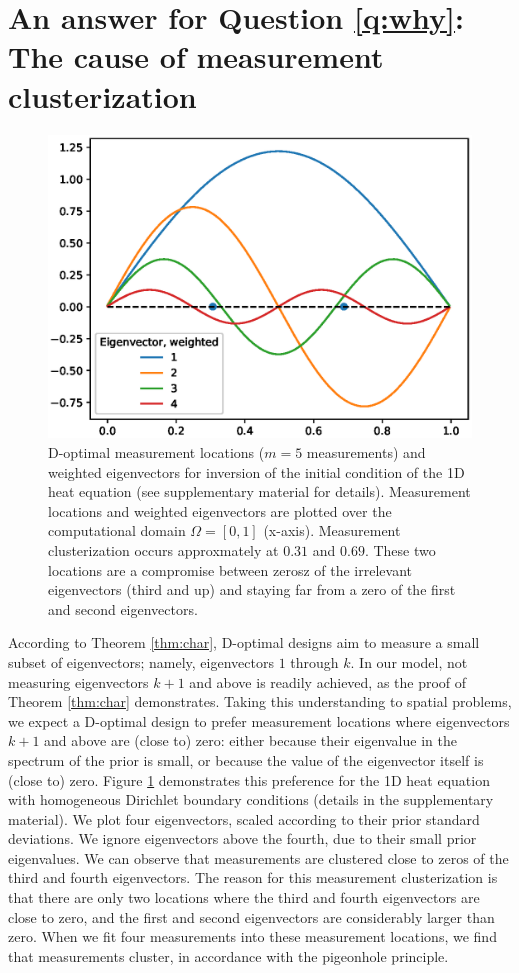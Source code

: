 \section{An answer for Question \ref{q:why}: The cause of measurement clusterization}\label{section:why}
\begin{figure}[H]
    \centering
    \includegraphics[height=0.5\textwidth]{eigenvectors.eps}
    \caption{D-optimal measurement locations ($m=5$ measurements) and
      weighted eigenvectors for inversion of the initial condition of
      the 1D heat equation (see supplementary material for
      details). Measurement locations and weighted eigenvectors are
      plotted over the computational domain $\Omega = [0, 1]$
      (x-axis).  Measurement clusterization occurs approxmately at
      $0.31$ and $0.69$. These two locations are a compromise between
      zerosz of the irrelevant eigenvectors (third and up) and staying
      far from a zero of the first and second eigenvectors.}
  \label{fig:why}
\end{figure}


According to Theorem \ref{thm:char}, D-optimal designs aim to measure
a small subset of eigenvectors; namely, eigenvectors $1$ through
$k$. In our model, not measuring eigenvectors $k+1$ and above is
readily achieved, as the proof of Theorem \ref{thm:char} demonstrates.
Taking this understanding to spatial problems, we expect a D-optimal
design to prefer measurement locations where eigenvectors $k+1$ and
above are (close to) zero: either because their eigenvalue in the
spectrum of the prior is small, or because the value of the
eigenvector itself is (close to) zero. Figure \ref{fig:why}
demonstrates this preference for the 1D heat equation with homogeneous
Dirichlet boundary conditions (details in the supplementary
material). We plot four eigenvectors, scaled according to their prior
standard deviations. We ignore eigenvectors above the fourth, due to
their small prior eigenvalues. We can observe that measurements are
clustered close to zeros of the third and fourth eigenvectors. The
reason for this measurement clusterization is that there are only two
locations where the third and fourth eigenvectors are close to zero,
and the first and second eigenvectors are considerably larger than
zero. When we fit four measurements into these measurement locations,
we find that measurements cluster, in accordance with the pigeonhole
principle.


